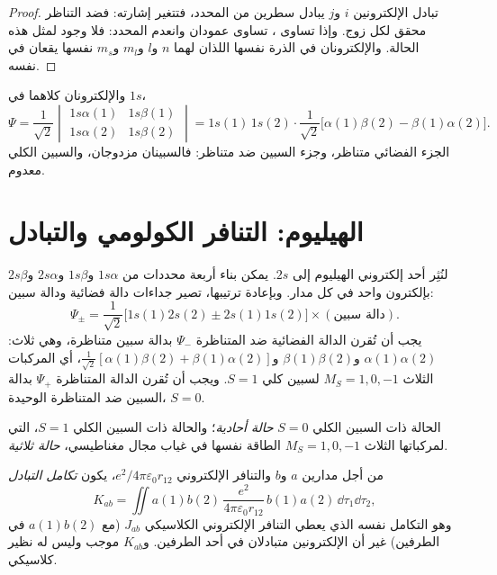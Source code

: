 \begin{proof}
تبادل الإلكترونين $i$ و$j$ يبادل سطرين من المحدد،
فتتغير إشارته: فضد التناظر محقق لكل زوج. وإذا تساوى
، تساوى عمودان وانعدم المحدد:
فلا وجود لمثل هذه الحالة. والإلكترونان في الذرة نفسها اللذان لهما $n$ و$l$
و$m_l$ و$m_s$ نفسها يقعان في  نفسه.
\end{proof}

\begin{example}\label{ex:b3:many-electron-atoms:helium-ground}
والإلكترونان كلاهما في $1s$،
\[
\Psi = \frac{1}{\sqrt2}\begin{vmatrix}1s\alpha(1) & 1s\beta(1)\\ 1s\alpha(2) &
1s\beta(2)\end{vmatrix} = 1s(1)\,1s(2)\cdot\frac{1}{\sqrt2}\big[\alpha(1)\beta(2)
- \beta(1)\alpha(2)\big].
\]
الجزء الفضائي متناظر، وجزء السبين ضد متناظر: فالسبينان
مزدوجان، والسبين الكلي معدوم.
\end{example}

\section{الهيليوم: التنافر الكولومي والتبادل}

لنُثِر أحد إلكتروني الهيليوم إلى $2s$. يمكن بناء أربعة محددات من
$1s\alpha$ و$1s\beta$ و$2s\alpha$ و$2s\beta$ بإلكترون واحد في كل مدار.
وبإعادة ترتيبها، تصير جداءات دالة فضائية ودالة سبين:
\[
\Psi_\pm = \frac{1}{\sqrt2}\big[1s(1)2s(2) \pm 2s(1)1s(2)\big]\times(\text{دالة
سبين}).
\]
يجب أن تُقرن الدالة الفضائية ضد المتناظرة $\Psi_-$ بدالة سبين
متناظرة، وهي ثلاث: $\alpha(1)\alpha(2)$ 
و$\beta(1)\beta(2)$ و$\frac{1}{\sqrt2}[\alpha(1)\beta(2) + \beta(1)\alpha(2)]$، أي
المركبات الثلاث $M_S = 1, 0, -1$ لسبين كلي $S = 1$. ويجب أن تُقرن الدالة المتناظرة
$\Psi_+$ بدالة السبين ضد المتناظرة الوحيدة، $S = 0$.

\begin{definition}\label{def:b3:many-electron-atoms:singlet-triplet}
الحالة ذات السبين الكلي $S = 0$ \emph{حالة أحادية}؛
والحالة ذات السبين الكلي $S = 1$، التي لمركباتها الثلاث $M_S = 1, 0, -1$
الطاقة نفسها في غياب مجال مغناطيسي، \emph{حالة
ثلاثية}.
\end{definition}

\begin{definition}\label{def:b3:many-electron-atoms:exchange}
من أجل مدارين $a$ و$b$ والتنافر الإلكتروني $e^2/4\pi\varepsilon_0
r_{12}$، يكون \emph{تكامل التبادل}
\[
K_{ab} = \iint a(1)b(2)\,\frac{e^2}{4\pi\varepsilon_0r_{12}}\,b(1)a(2)\,\dd\tau_1\dd\tau_2,
\]
وهو التكامل نفسه الذي يعطي التنافر الإلكتروني الكلاسيكي $J_{ab}$ (مع
$a(1)b(2)$ في الطرفين) غير أن الإلكترونين متبادلان في
أحد الطرفين. و$K_{ab}$ موجب وليس له نظير كلاسيكي.
\end{definition}

